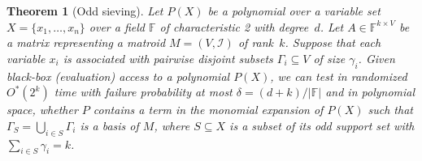 \documentclass[10pt,a4paper]{article}
\newtheorem{theorem}{Theorem}[section]
\newcommand{\F}{\ensuremath{\mathbb F}\xspace}
\newcommand{\cI}{\ensuremath{\mathcal I}\xspace}
\newcommand{\Oh}{O}
\begin{document}
\begin{theorem}[Odd sieving] \label{theorem:matroid-sieving}
  Let $P(X)$ be a polynomial over a variable set $X = \{ x_1, \dots, x_n \}$ over a field $\F$ of characteristic 2 with degree~$d$.
  Let $A \in \F^{k \times V}$ be a matrix representing a matroid $M=(V, \cI)$ of rank~$k$. 
  Suppose that each variable $x_i$ is associated with pairwise disjoint subsets $\Gamma_i \subseteq V$ of size $\gamma_i$.
  Given black-box (evaluation) access to a polynomial $P(X)$, we can test in randomized $\Oh^*(2^{k})$ time with failure probability at most $\delta = (d + k) / |\F|$ and in polynomial space, whether $P$ contains a term in the monomial expansion of $P(X)$
  such that $\Gamma_S = \bigcup_{i \in S} \Gamma_i$ is a basis of $M$, where $S \subseteq X$ is a subset of its odd support set with $\sum_{i \in S} \gamma_i = k$.
\end{theorem}
\end{document}
